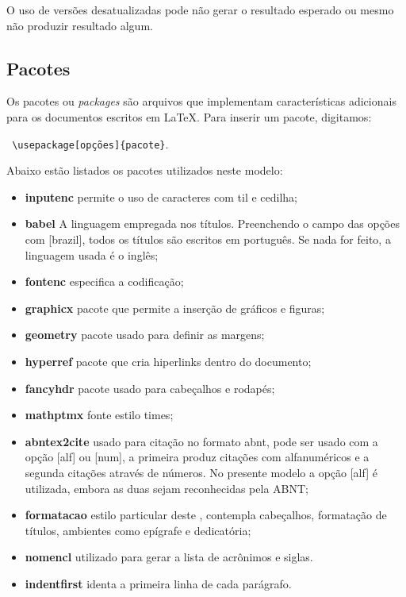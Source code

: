 O uso de versões desatualizadas pode não gerar o resultado esperado ou mesmo não produzir resultado algum.



\subsection{Pacotes}

Os pacotes ou \textit{packages} são arquivos que implementam características adicionais para os documentos escritos em \LaTeX. Para inserir um pacote, digitamos:

 \verb+ \usepackage[opções]{pacote}+.

Abaixo estão listados os pacotes utilizados neste modelo:

\begin{itemize}
\item \textbf{inputenc} permite o uso de caracteres com til e cedilha;

\item \textbf{babel} A linguagem empregada nos títulos. Preenchendo o campo das opções com [brazil], todos os títulos são escritos em português. Se nada for feito, a linguagem usada é o inglês;

\item \textbf{fontenc} especifica a codificação;

\item \textbf{graphicx} pacote que permite a inserção de gráficos e figuras;

\item \textbf{geometry} pacote usado para definir as margens;

\item \textbf{hyperref} pacote que cria hiperlinks dentro do documento;

\item \textbf{fancyhdr} pacote usado para cabeçalhos e rodapés;

\item \textbf{mathptmx} fonte estilo times;

\item \textbf{abntex2cite}	usado para citação no formato abnt, pode ser usado com a opção [alf] ou [num], a primeira produz citações com alfanuméricos e a segunda citações através de números. No presente modelo a opção [alf] é utilizada, embora as duas sejam reconhecidas pela ABNT;

\item \textbf{formatacao} estilo particular deste \titulo, contempla cabeçalhos, formatação de títulos, ambientes como epígrafe e dedicatória;

\item \textbf{nomencl} utilizado para gerar a lista de acrônimos e siglas.

\item \textbf{indentfirst} identa a primeira linha de cada parágrafo.

\end{itemize}


